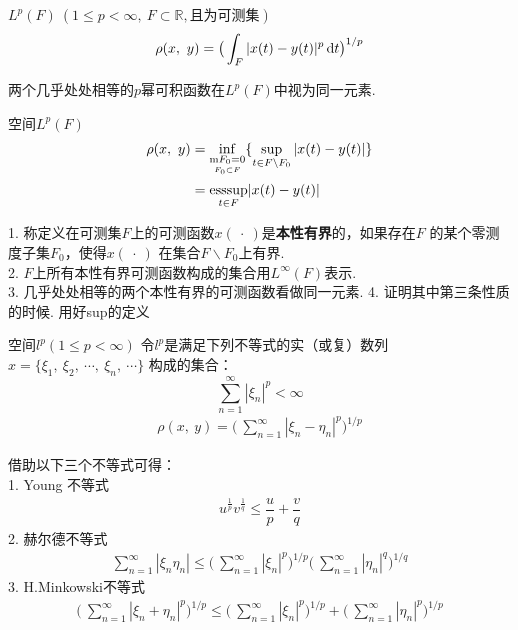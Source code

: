 \begin{newex}
	$L^p(F) \ (1 \leqslant p < \infty , \ F \subset \mathbb R , \mbox{且为可测集})$\
	\begin{align}
        \rho (x , \ y)= \big( \int_{F} |x(t)-y(t)|^p \operatorname{d\!} t \big)^{1/p}
        \label{eq:rho4}
	\end{align}
\end{newex}
\begin{note}
	两个几乎处处相等的$p$幂可积函数在$L^p(F)$中视为同一元素.
\end{note}

\begin{newex}
	空间$L^p (F)$
	\begin{align}
		\rho (x, \ y) & = \inf _{\underset{  F_0 \subset F}{  \mathrm{m} F_0=0}}
		\{ \sup\limits_{t \in F \backslash F_0}  | x(t)-y(t)|  \} \notag         \\
		              & = \underset{t \in F }{\mathrm{esssup}} |x(t) - y(t)|
	\end{align}
\end{newex}
\begin{note}
	1. 称定义在可测集$F$上的可测函数$x(\ \cdot \ )$是\textbf{本性有界}的，如果存在$F$
	的某个零测度子集$F_0$，使得$x( \ \cdot \ )$ 在集合$F\backslash F_0$上有界.\\
	2. $F$上所有本性有界可测函数构成的集合用$L^\infty (F)$表示.\\
	3. 几乎处处相等的两个本性有界的可测函数看做同一元素.
	4. 证明其中第三条性质的时候. 用好sup的定义
\end{note}

\begin{newex}
	空间$l^p (1 \leqslant p < \infty)$
	令$l^p$是满足下列不等式的实（或复）数列$x=\{ \xi_1,\ \xi_2, \ \cdots, \ \xi_n,\ \cdots  \}$
	构成的集合：$$\sum \limits_{n=1}^\infty |\xi_n|^p<\infty$$
	\begin{align}
		\rho(x, \ y)=\big(\ \sum \limits_{n=1}^\infty |\xi_n-\eta_n|^p  \big)^{1/p}
	\end{align}
\end{newex}
\begin{note}
	借助以下三个不等式可得：\\
	1. Young 不等式
	\begin{align}
		u^{\frac{1}{p}}v^{ \frac{1}{q}}\leqslant \dfrac{u}{p}+\dfrac{v}{q}
	\end{align}
	2. 赫尔德不等式
	\begin{align}
		\sum \limits_{n=1}^\infty |\xi_n \eta_n| \leqslant
		\big(\ \sum \limits_{n=1}^\infty |\xi_n|^p  \big)^{1/p}
		\big(\ \sum \limits_{n=1}^\infty |\eta_n|^q  \big)^{1/q}
	\end{align}
	3. H.Minkowski不等式
	\begin{align}
		\big(\ \sum \limits_{n=1}^\infty |\xi_n+\eta_n|^p  \big)^{1/p}\leqslant
		\big(\ \sum \limits_{n=1}^\infty |\xi_n|^p  \big)^{1/p}+
		\big(\ \sum \limits_{n=1}^\infty |\eta_n|^p  \big)^{1/p}
	\end{align}
\end{note}

